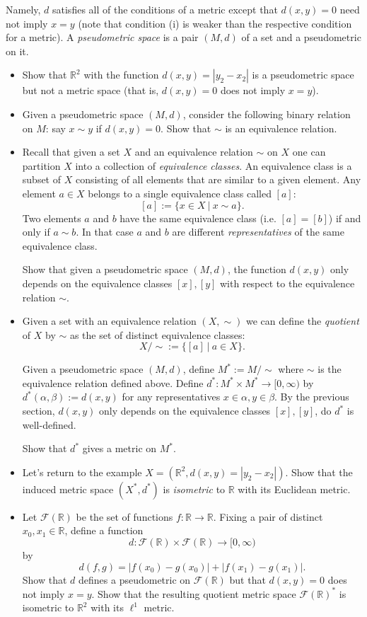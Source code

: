 \documentclass[12pt]{article}
\newcommand\bi{\begin{itemize}}
\newcommand\ei{\end{itemize}}
\newcommand\itema{\item[(a)]}
\newcommand\itemb{\item[(b)]}
\newcommand\itemc{\item[(c)]}
\newcommand\itemd{\item[(d)]}
\newcommand\iteme{\item[(e)]}
\newcommand\itemf{\item[(f)]}
\renewcommand\|{\ | \ }
\newcommand\ra{\rightarrow}
\newcommand\mc\mathcal
\newcommand\R{\mathbb{R}}
\begin{document}
Namely, $d$ satisfies all of the conditions of a metric except that
$d(x, y) = 0$ need not imply $x = y$ (note that condition (i) is weaker than
the respective condition for a metric). A \emph{pseudometric space} is a pair
$(M, d)$ of a set and a pseudometric on it.

\bi
\itema
Show that $\R^2$ with the function $d(x, y) = |y_2 - x_2|$ is a pseudometric
space but not a metric space (that is, $d(x, y) = 0$ does not imply $x = y$).

\itemb
Given a pseudometric space $(M, d)$, consider the following binary relation
on $M$: say $x \sim y$ if $d(x, y) = 0$. Show that $\sim$ is an equivalence
relation.

\itemc
Recall that given a set $X$ and an equivalence relation $\sim$ on $X$ one
can partition $X$ into a collection of \emph{equivalence classes}. An 
equivalence class is a subset of $X$ consisting of all elements that are 
similar to a given element. Any element $a \in X$ belongs to a single 
equivalence class called $[a]$:
\[
[a] := \{ x \in X \| x \sim a \}.
\]
Two elements $a$ and $b$ have the same equivalence class (i.e. $[a] = [b]$)
if and only if $a \sim b$. In that case $a$ and $b$ are different
\emph{representatives} of the same equivalence class.

Show that given a pseudometric space $(M, d)$, the function $d(x, y)$ only
depends on the equivalence classes $[x], [y]$ with respect to the 
equivalence relation $\sim$.

\itemd
Given a set with an equivalence relation $(X, \sim)$ we can define the
\emph{quotient} of $X$ by $\sim$ as the set of distinct equivalence classes:
\[
X / \sim := \{ [a] \| a \in X \}.
\]

Given a pseudometric space $(M, d)$, define $M^* := M / \sim$ where $\sim$
is the equivalence relation defined above. Define 
$d^*: M^* \times M^* \ra [0, \infty)$ by $d^*(\alpha, \beta) := d(x, y)$
for any representatives $x \in \alpha, y \in \beta$. By the previous section,
$d(x, y)$ only depends on the equivalence classes $[x], [y]$, do $d^*$ is
well-defined.

Show that $d^*$ gives a metric on $M^*$.

\iteme
Let's return to the example $X = (\R^2, d(x, y) = |y_2 - x_2|)$. Show that
the induced metric space $(X^*, d^*)$ is \emph{isometric} to $\R$ with its
Euclidean metric.

\itemf
Let $\mc F(\R)$ be the set of functions $f: \R \ra \R$. Fixing a pair of 
distinct $x_0, x_1 \in \R$, define a function 
\[
d: \mc F(\R) \times \mc F(\R) \ra [0, \infty)
\]
by 
\[
d(f, g) = |f(x_0) - g(x_0)| + |f(x_1) - g(x_1)|.
\]
Show that $d$ defines a pseudometric on $\mc F(\R)$ but that $d(x, y) = 0$
does not imply $x = y$. Show that the resulting quotient metric space
$\mc F(\R)^*$ is isometric to $\R^2$ with its $\ell^1$ metric.
\ei
\end{document}
